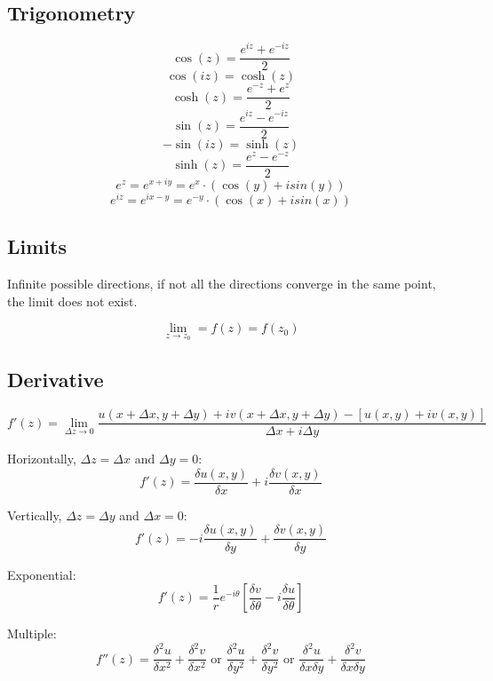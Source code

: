 \documentclass[letterpaper]{article}
\newcommand{\divline}{\noindent\makebox[\linewidth]{\rule{\textwidth}{0.4pt}}}
\begin{document}
	\divline
 
	\begin{multicols}{3}
		\section{Trigonometry}
			\[\cos{(z)} = \frac{e^{iz} + e^{-iz}}{2}\]
			\[\cos{(iz)} = \cosh{(z)}\]
			\[\cosh{(z)} = \frac{e^{-z} + e^{z}}{2}\]
			\[\sin{(z)} = \frac{e^{iz} - e^{-iz}}{2}\]
			\[-\sin{(iz)} = \sinh{(z)}\]
			\[\sinh{(z)} = \frac{e^{z} - e^{-z}}{2}\]
			\[e^{z} = e^{x + iy} = e^{x} \cdot (\cos(y) + isin(y))\]
			\[e^{iz} = e^{ix - y} = e^{-y} \cdot (\cos(x) + isin(x))\]
	\end{multicols}
 
	\divline
 
	\begin{multicols}{2}
		\section{Limits}
			Infinite possible directions, if not all the directions converge in the same point, the limit does not exist.
			
			\[\lim_{z \to z_0} = f(z) = f(z_0)\]
	\end{multicols}
 
	\divline
 
	\begin{multicols}{2}
		\section{Derivative}
			\[f'(z) = \lim_{\Delta z \to 0} \frac{u(x + \Delta x, y + \Delta y) + iv(x + \Delta x, y + \Delta y) - [u(x,y) + iv(x,y)]}{\Delta x + i \Delta y} \]
			
			Horizontally, \(\Delta z = \Delta x\) and \(\Delta y = 0\):
			\[f'(z) = \frac{\delta u(x,y)}{\delta x} + i\frac{\delta v(x,y)}{\delta x}\]
			
			Vertically, \(\Delta z = \Delta y\) and \(\Delta x = 0\):
			\[f'(z) = -i \frac{\delta u(x,y)}{\delta y} + \frac{\delta v(x,y)}{\delta y}\]
			
			Exponential:
			\[f'(z) = \frac{1}{r} e^{-i\theta} \left[\frac{\delta v}{\delta \theta} -i \frac{\delta u}{\delta \theta}\right]\]
			
			Multiple:
			\[f''(z) = \frac{\delta^{2} u}{\delta x^{2}} + \frac{\delta^{2} v}{\delta x^{2}} \text{ or } \frac{\delta^{2} u}{\delta y^{2}} + \frac{\delta^{2} v}{\delta y^{2}} \text{ or } \frac{\delta^{2} u}{\delta x \delta y} + \frac{\delta^{2} v}{\delta x \delta y} \] 
	\end{multicols}
 
\end{document}
